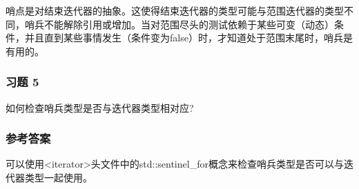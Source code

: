 哨点是对结束迭代器的抽象。这使得结束迭代器的类型可能与范围迭代器的类型不同，哨兵不能解除引用或增加。当对范围尽头的测试依赖于某些可变（动态）条件，并且直到某些事情发生（条件变为false）时，才知道处于范围末尾时，哨兵是有用的。

\subsubsection{习题 5}

如何检查哨兵类型是否与迭代器类型相对应?

\subsubsection{参考答案}

可以使用<iterator>头文件中的std::sentinel\_for概念来检查哨兵类型是否可以与迭代器类型一起使用。












